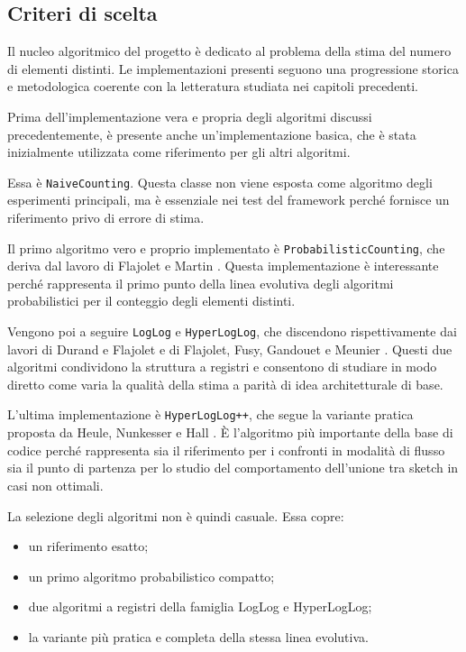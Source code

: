 \subsection{Criteri di scelta}

Il nucleo algoritmico del progetto è dedicato al problema della stima del numero
di elementi distinti. Le implementazioni presenti seguono una progressione
storica e metodologica coerente con la letteratura studiata nei capitoli
precedenti.

Prima dell'implementazione vera e propria degli algoritmi discussi precedentemente, è presente anche
un'implementazione basica, che è stata inizialmente utilizzata come riferimento per gli altri algoritmi.

Essa è \texttt{NaiveCounting}. Questa classe non viene esposta come algoritmo degli esperimenti
principali, ma è essenziale nei test del framework perché fornisce un
riferimento privo di errore di stima.

Il primo algoritmo vero e proprio implementato è \texttt{ProbabilisticCounting}, che deriva dal lavoro di
Flajolet e Martin \cite{Flajolet_Martin_1985}. Questa implementazione è
interessante perché rappresenta il primo punto della linea evolutiva degli
algoritmi probabilistici per il conteggio degli elementi distinti.

Vengono poi a seguire \texttt{LogLog} e \texttt{HyperLogLog}, che
discendono rispettivamente dai lavori di Durand e Flajolet
\cite{Durand_Flajolet_2003} e di Flajolet, Fusy, Gandouet e Meunier
\cite{Flajolet_Fusy_Gandouet_Meunier_2007}. Questi due algoritmi condividono la
struttura a registri e consentono di studiare in modo diretto come varia la
qualità della stima a parità di idea architetturale di base.

L'ultima implementazione è \texttt{HyperLogLog++}, che segue la variante pratica
proposta da Heule, Nunkesser e Hall \cite{Heule_Nunkesser_Hall_2013}. È
l'algoritmo più importante della base di codice perché rappresenta sia il riferimento
per i confronti in modalità di flusso sia il punto di partenza per lo studio del comportamento dell'unione tra sketch in casi non ottimali.

La selezione degli algoritmi non è quindi casuale. Essa copre:
\begin{itemize}
    \item un riferimento esatto;
    \item un primo algoritmo probabilistico compatto;
    \item due algoritmi a registri della famiglia LogLog e HyperLogLog;
    \item la variante più pratica e completa della stessa linea evolutiva.
\end{itemize}


